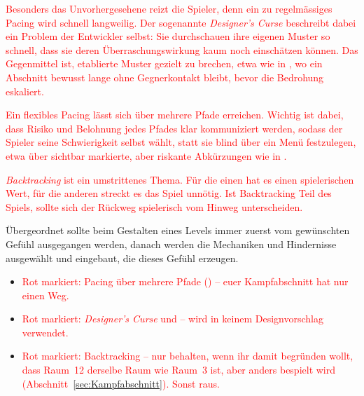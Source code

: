\documentclass[../Main.tex]{subfiles}
\begin{document}
\textcolor{red}{Besonders das Unvorhergesehene reizt die Spieler, denn ein zu regelmässiges Pacing wird schnell langweilig. Der sogenannte \textit{Designer's Curse} beschreibt dabei ein Problem der Entwickler selbst: Sie durchschauen ihre eigenen Muster so schnell, dass sie deren Überraschungswirkung kaum noch einschätzen können. Das Gegenmittel ist, etablierte Muster gezielt zu brechen, etwa wie in ,\autocite{visceral_deadspace2_2011} wo ein Abschnitt bewusst lange ohne Gegnerkontakt bleibt, bevor die Bedrohung eskaliert.\autocite{gdc_tenprinciples2010}}

\textcolor{red}{Ein flexibles Pacing lässt sich über mehrere Pfade erreichen. Wichtig ist dabei, dass Risiko und Belohnung jedes Pfades klar kommuniziert werden, sodass der Spieler seine Schwierigkeit selbst wählt, statt sie blind über ein Menü festzulegen, etwa über sichtbar markierte, aber riskante Abkürzungen wie in .\autocite{criterion_burnout_2001,gdc_tenprinciples2010}}

\textcolor{red}{\textit{Backtracking} ist ein umstrittenes Thema. Für die einen hat es einen spielerischen Wert, für die anderen streckt es das Spiel unnötig. Ist Backtracking Teil des Spiels, sollte sich der Rückweg spielerisch vom Hinweg unterscheiden.\autocite{gdc_tenprinciples2010}}

Übergeordnet sollte beim Gestalten eines Levels immer zuerst vom gewünschten Gefühl ausgegangen werden, danach werden die Mechaniken und Hindernisse ausgewählt und eingebaut, die dieses Gefühl erzeugen.\autocite{gdc_tenprinciples2010}

\begin{itemize}[leftmargin=1.5cm]
    \item \textcolor{red}{Rot markiert: Pacing über mehrere Pfade () -- euer Kampfabschnitt hat nur einen Weg.}
    \item \textcolor{red}{Rot markiert: \textit{Designer's Curse} und  -- wird in keinem Designvorschlag verwendet.}
    \item \textcolor{red}{Rot markiert: Backtracking -- nur behalten, wenn ihr damit begründen wollt, dass Raum~12 derselbe Raum wie Raum~3 ist, aber anders bespielt wird (Abschnitt~\ref{sec:Kampfabschnitt}). Sonst raus.}
\end{itemize}
\end{document}
